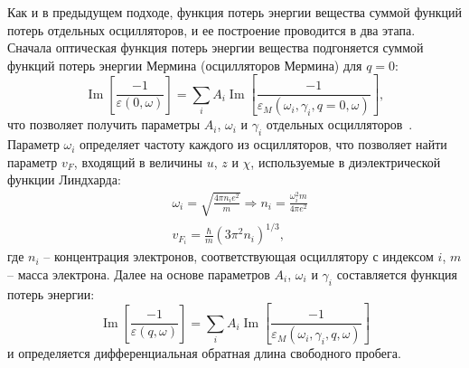 Как и в предыдущем подходе, функция потерь энергии вещества суммой функций потерь отдельных осцилляторов, и ее построение проводится в два этапа. Сначала оптическая функция потерь энергии вещества подгоняется суммой функций потерь энергии Мермина (осцилляторов Мермина) для $q=0$:
\begin{equation}
	\operatorname{Im}\left[\frac{-1}{\varepsilon(0, \omega)}\right]=\sum_i A_i \operatorname{Im}\left[\frac{-1}{\varepsilon_M\left(\omega_i, \gamma_i, q=0, \omega\right)}\right],
\end{equation}
что позволяет получить параметры $A_i$, $\omega_i$ и $\gamma_i$ отдельных осцилляторов~\cite{DeVera_MELF_params}. Параметр $\omega_i$ определяет частоту каждого из осцилляторов, что позволяет найти параметр $v_F$, входящий в величины $u$, $z$ и $\chi$, используемые в диэлектрической функции Линдхарда:
\begin{equation}
	\begin{aligned}
		&\omega_i=\sqrt{\frac{4 \pi n_i e^2}{m}} \Rightarrow n_i=\frac{\omega_i^2 m}{4 \pi e^2} \\
		&v_{F_i}=\frac{\hbar}{m}\left(3 \pi^2 n_i\right)^{1/3},
	\end{aligned}
\end{equation}
где $n_i$ -- концентрация электронов, соответствующая осциллятору с индексом $i$, $m$ -- масса электрона. Далее на основе параметров $A_i$, $\omega_i$ и $\gamma_i$ составляется функция потерь энергии:
\begin{equation}
	\operatorname{Im}\left[\frac{-1}{\varepsilon(q, \omega)}\right]=\sum_i A_i \operatorname{Im}\left[\frac{-1}{\varepsilon_M\left(\omega_i, \gamma_i, q, \omega\right)}\right]
\end{equation}
и определяется дифференциальная обратная длина свободного пробега.
